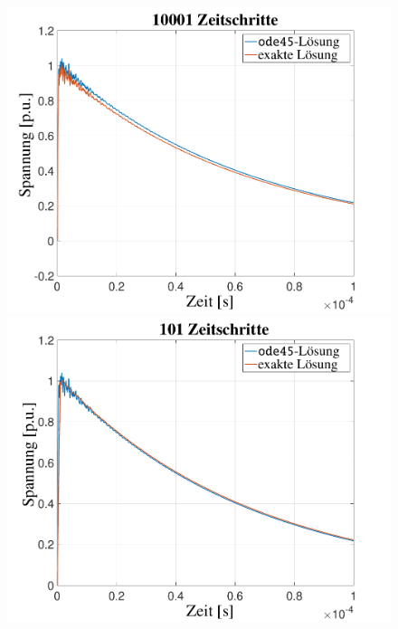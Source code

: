 \begin{refsection}
\begin{figure}
\begin{minipage}{.32\textwidth}
	    \end{minipage}
	    \begin{minipage}{.32\textwidth}
	        \centering
	        \includegraphics[width=\linewidth]{./trafo/images/Sprung10001.pdf}
	    \end{minipage}
		\begin{minipage}{.32\textwidth}
	        \centering
	        \includegraphics[width=\linewidth]{./trafo/images/Interp101.pdf}
	    \end{minipage}%
	    \begin{minipage}{.32\textwidth}
	        \centering

\end{minipage}
\end{figure}
\end{refsection}

